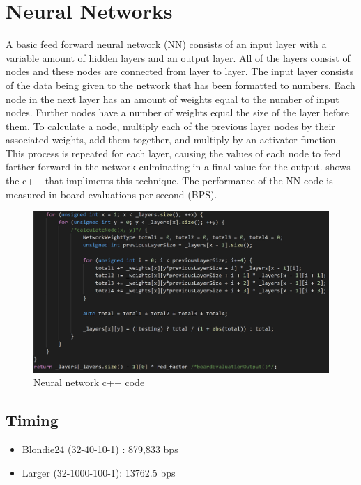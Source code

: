 \documentclass{article}
\begin{document}
\section{Neural Networks}

A basic feed forward neural network (NN) consists of an input layer
with a variable amount of hidden layers and an output layer. All of the layers
consist of nodes and these nodes are connected from layer to layer. The input
layer consists of the data being given to the network that has been formatted
to numbers. Each node in the next layer has an amount of weights equal to the
number of input nodes. Further nodes have a number of weights equal the size of
the layer before them. To calculate a node, multiply each of the previous layer
nodes by their associated weights, add them together, and multiply by an
activator function. This process is repeated for each layer, causing the values
of each node to feed farther forward in the network culminating in a final
value for the output.  shows the c++ that impliments this technique.
The performance of the NN code is measured in board evaluations per
second (BPS).

\begin{figure}
    \includegraphics[width=\linewidth]{images/nn-code.png}
    \caption{Neural network c++ code}
    \label{fig:nn-code}
\end{figure}

\subsection{Timing}

\begin{itemize}
    \item Blondie24 (32-40-10-1)   : 879,833 bps
    \item Larger    (32-1000-100-1): 13762.5 bps
\end{itemize}
\end{document}
